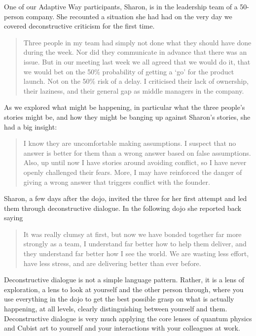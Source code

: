 \begin{longstoryblock}
One of our Adaptive Way  participants, Sharon, is in the leadership team of a 50-person company. She recounted a situation she had had on the very day we covered deconstructive criticism for the first time.


\begin{quote}Three people in my team had simply not done what they should have done during the week. Nor did they communicate in advance that there was an issue. But in our meeting last week we all agreed that we would do it, that we would bet on the 50\% probability of getting a ‘go’ for the product launch. Not on the 50\% risk of a delay. I criticised their lack of ownership, their laziness, and their general gap as middle managers in the company.\end{quote}


As we explored what might be happening, in particular what the three people’s stories might be, and how they might be banging up against Sharon's stories, she had a big insight: \begin{quote}I know they are uncomfortable making assumptions. I suspect that no answer is better for them than a wrong answer based on false assumptions. Also, up until now I have stories around avoiding conflict, so I have never openly challenged their fears. More, I may have reinforced the danger of giving a wrong answer that triggers conflict with the founder.\end{quote}


Sharon, a few days after the dojo, invited the three for her first attempt and led them  through deconstructive dialogue. In the following dojo she reported back saying \begin{quote}It was really clumsy at first, but now we have bonded together far more strongly as a team, I understand far better how to help them deliver, and they understand far better how I see the world. We are wasting less effort, have less stress, and are delivering better than ever before.\end{quote}
\end{longstoryblock}


Deconstructive dialogue is not a simple language pattern. Rather, it is a lens of exploration, a lens to look at yourself and the other person through, where you use everything in the dojo to get the best possible grasp on what is actually happening, at all levels, clearly distinguishing between yourself and them. Deconstructive dialogue is very much applying the core lenses of quantum physics and Cubist art  to yourself and your interactions with your colleagues at work.   


